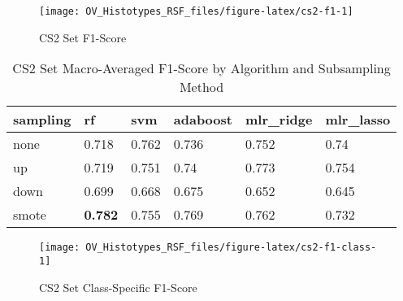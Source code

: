 \documentclass[
]{report}
\begin{document}
\begin{figure}[H]

{\centering \texttt{[image: OV\_Histotypes\_RSF\_files/figure-latex/cs2-f1-1]} 

}

\caption{CS2 Set F1-Score}\label{fig:cs2-f1}
\end{figure}

\begin{table}

\caption{\label{tab:cs2-f1-table}CS2 Set Macro-Averaged F1-Score by Algorithm and Subsampling Method}
\centering
\begin{tabular}[t]{l|l|l|l|l|l}
\hline
sampling & rf & svm & adaboost & mlr\_ridge & mlr\_lasso\\
\hline
none & 0.718 & 0.762 & 0.736 & 0.752 & 0.74\\
\hline
up & 0.719 & 0.751 & 0.74 & 0.773 & 0.754\\
\hline
down & 0.699 & 0.668 & 0.675 & 0.652 & 0.645\\
\hline
smote & \textbf{0.782} & 0.755 & 0.769 & 0.762 & 0.732\\
\hline
\end{tabular}
\end{table}

\begin{figure}[H]

{\centering \texttt{[image: OV\_Histotypes\_RSF\_files/figure-latex/cs2-f1-class-1]} 

}

\caption{CS2 Set Class-Specific F1-Score}\label{fig:cs2-f1-class}
\end{figure}
\end{document}
